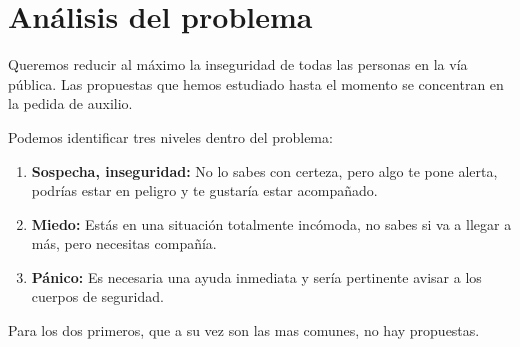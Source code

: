 \chapter{Análisis del problema}
 
Queremos reducir al máximo la inseguridad de todas las personas en la vía pública.
Las propuestas que hemos estudiado hasta el momento se concentran en la pedida de auxilio.

Podemos identificar tres niveles dentro del problema:
\begin{enumerate}
  \item \textbf{Sospecha, inseguridad:} No lo sabes con certeza, pero algo te pone alerta, podrías estar en peligro y te gustaría estar acompañado.
  \item \textbf{Miedo:} Estás en una situación totalmente incómoda, no sabes si va a llegar a más, pero necesitas compañía.
  \item \textbf{Pánico:} Es necesaria una ayuda inmediata y sería pertinente avisar a los cuerpos de seguridad.
\end{enumerate}

Para los dos primeros, que a su vez son las mas comunes, no hay propuestas.